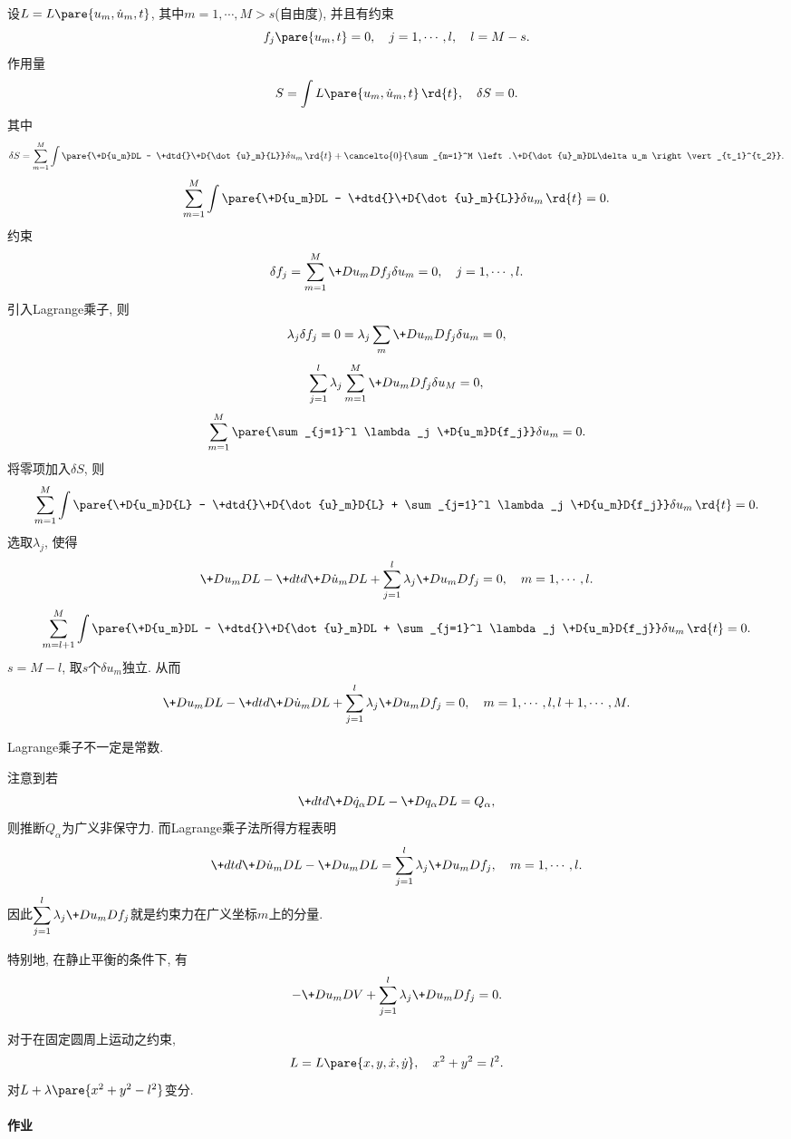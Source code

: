 \documentclass{ctexart}
\begin{document}
设$L = L\pare{u_m,\dot{u}_m, t}$, 其中$m=1,\cdots,M>s$(自由度), 并且有约束
\[ f_j\pare{u_m,t} = 0,\quad j = 1,\cdots, l,\quad l = M-s. \]
作用量
\[ S = \int L\pare{u_m,\dot{u}_m,t}\,\rd{t},\quad \delta S = 0. \]
其中
\[ \delta S = \sum_{m=1}^M \int\pare{\+D{u_m}DL - \+dtd{}\+D{\dot{u}_m}{L}}\delta u_m \,\rd{t} + \cancelto{0}{\sum_{m=1}^M \left.\+D{\dot{u}_m}DL\delta u_m \right\vert_{t_1}^{t_2}}. \]
\[ \sum_{m=1}^M \int \pare{\+D{u_m}DL - \+dtd{}\+D{\dot{u}_m}{L}}\delta u_m \,\rd{t} = 0. \]
约束
\[ \delta f_j = \sum_{m=1}^M \+D{u_m}D{f_j} \delta u_m = 0,\quad j = 1,\cdots, l. \]
引入Lagrange乘子, 则
\[ \lambda_j \delta f_j = 0 = \lambda_j \sum_m\+D{u_m}D{f_j}\delta u_m = 0, \]
\[ \sum_{j=1}^l \lambda_j \sum_{m=1}^M \+D{u_m}D{f_j} \delta u_M = 0, \]
\[ \sum_{m=1}^M \pare{\sum_{j=1}^l \lambda_j \+D{u_m}D{f_j}}\delta u_m = 0. \]
将零项加入$\delta S$, 则
\[ \sum_{m=1}^M \int \pare{\+D{u_m}D{L} - \+dtd{}\+D{\dot{u}_m}D{L} + \sum_{j=1}^l \lambda_j \+D{u_m}D{f_j}}\delta u_m\,\rd{t} = 0. \]
选取$\lambda_j$, 使得
\[ \+D{u_m}D{L} - \+dtd{} \+D{\dot{u}_m}DL + \sum_{j=1}^l \lambda_j \+D{u_m}D{f_j} = 0,\quad  m = 1,\cdots, l. \]
\[ \sum_{m=l+1}^M \int\pare{\+D{u_m}DL - \+dtd{}\+D{\dot{u}_m}DL + \sum_{j=1}^l \lambda_j \+D{u_m}D{f_j}}\delta u_m\,\rd{t} = 0. \]
$s = M-l$, 取$s$个$\delta u_m$独立. 从而
\[ \+D{u_m}DL - \+dtd{}\+D{\dot{u}_m}DL + \sum_{j=1}^l \lambda_j \+D{u_m}D{f_j} = 0,\quad m = 1,\cdots, l,l+1,\cdots, M. \]
\begin{pitfall}
    Lagrange乘子不一定是常数.
\end{pitfall}
注意到若
\[ \+dtd{} \+D{\dot{q}_\alpha}DL - \+D{q_\alpha}DL = Q_\alpha, \]
则推断$Q_\alpha$为广义非保守力. 而Lagrange乘子法所得方程表明
\[ \+dtd{} \+D{\dot{u}_m}DL - \+D{u_m}D{L} = \sum_{j=1}^l \lambda_j \+D{u_m}D{f_j},\quad  m = 1,\cdots, l. \]
因此$\displaystyle \sum_{j=1}^l \lambda_j \+D{u_m}D{f_j}$就是约束力在广义坐标$m$上的分量.
\par
特别地, 在静止平衡的条件下, 有
\[ -\+D{u_m}DV + \sum_{j=1}^l \lambda_j \+D{u_m}D{f_j} = 0. \]
\begin{sample}
    \begin{ex}
        对于在固定圆周上运动之约束,
        \[ L = L\pare{x,y,\dot{x},\dot{y}},\quad  x^2+y^2=l^2. \]
        对$L+\lambda\pare{x^2+y^2 - l^2}$变分.
    \end{ex}
\end{sample}


\paragraph{作业} %
\label{par:作业}
\end{document}
